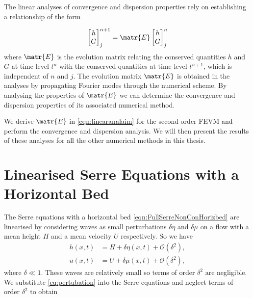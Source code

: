 The linear analyses of convergence and dispersion properties rely on establishing a relationship of the form

\begin{equation}
\label{eqn:linearanalaim}
\begin{bmatrix}
h \\G
\end{bmatrix}^{n+1}_j = \matr{E} \begin{bmatrix}
h \\G
\end{bmatrix}^{n}_j
\end{equation}
 where $\matr{E}$ is the evolution matrix relating the conserved quantities $h$ and $G$ at time level $t^n$ with the conserved quantities at time level $t^{n+1}$, which is independent of $n$ and $j$. The evolution matrix $\matr{E}$ is obtained in the analyses by propagating Fourier modes through the numerical scheme. By analysing the properties of $\matr{E}$ we can determine the convergence and dispersion properties of its associated numerical method.
 
 We derive $\matr{E}$ in \eqref{eqn:linearanalaim} for the second-order FEVM and perform the convergence and dispersion analysis. We will then present the results of these analyses for all the other numerical methods in this thesis.
 
\section{Linearised Serre Equations with a Horizontal Bed}
The Serre equations with a horizontal bed \eqref{eqn:FullSerreNonConHorizbed} are linearised by considering waves as small perturbations $\delta\eta$ and $\delta \mu$ on a flow with a mean height $H$ and a mean velocity $U$ respectively. So we have
\begin{subequations}
	\label{eq:pertubation}
\begin{align}
h(x,t) &= H + \delta \eta(x,t) + \mathcal{O}\left(\delta^2 \right), \\
u(x,t) &= U + \delta \mu(x,t) + \mathcal{O}\left(\delta^2 \right),
\end{align}
\end{subequations}
where $\delta \ll 1$. These waves are relatively small so terms of order $\delta^2$ are negligible. We substitute \eqref{eq:pertubation} into the Serre equations and neglect terms of order $\delta^2$ to obtain

